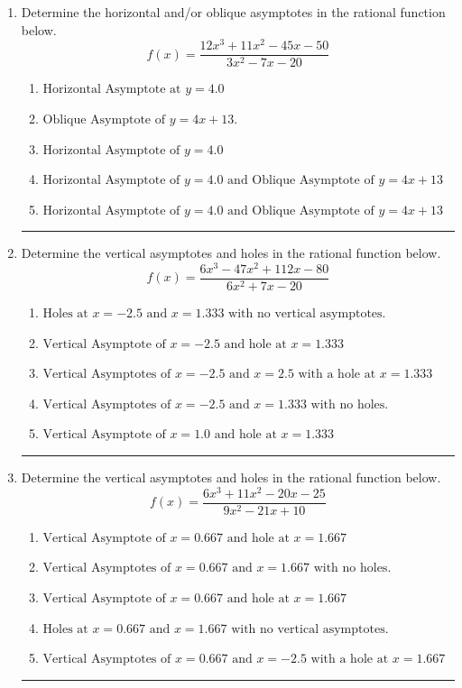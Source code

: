 \documentclass[14pt]{extbook}
\newcommand{\litem}[1]{\item#1\hspace*{-1cm}\rule{\textwidth}{0.4pt}}
\begin{document}
\begin{enumerate}
{\begin{enumerate}[label=\Alph*.]
\end{enumerate} }
\litem{
Determine the horizontal and/or oblique asymptotes in the rational function below.\[ f(x) = \frac{12x^{3} +11 x^{2} -45 x -50}{3x^{2} -7 x -20} \]\begin{enumerate}[label=\Alph*.]
\item \( \text{Horizontal Asymptote at } y = 4.0 \)
\item \( \text{Oblique Asymptote of } y = 4x + 13. \)
\item \( \text{Horizontal Asymptote of } y = 4.0  \)
\item \( \text{Horizontal Asymptote of } y = 4.0 \text{ and Oblique Asymptote of } y = 4x + 13 \)
\item \( \text{Horizontal Asymptote of } y = 4.0 \text{ and Oblique Asymptote of } y = 4x + 13 \)

\end{enumerate} }
\litem{
Determine the vertical asymptotes and holes in the rational function below.\[ f(x) = \frac{6x^{3} -47 x^{2} +112 x -80}{6x^{2} +7 x -20} \]\begin{enumerate}[label=\Alph*.]
\item \( \text{Holes at } x = -2.5 \text{ and } x = 1.333 \text{ with no vertical asymptotes.} \)
\item \( \text{Vertical Asymptote of } x = -2.5 \text{ and hole at } x = 1.333 \)
\item \( \text{Vertical Asymptotes of } x = -2.5 \text{ and } x = 2.5 \text{ with a hole at } x = 1.333 \)
\item \( \text{Vertical Asymptotes of } x = -2.5 \text{ and } x = 1.333 \text{ with no holes.} \)
\item \( \text{Vertical Asymptote of } x = 1.0 \text{ and hole at } x = 1.333 \)

\end{enumerate} }
\litem{
Determine the vertical asymptotes and holes in the rational function below.\[ f(x) = \frac{6x^{3} +11 x^{2} -20 x -25}{9x^{2} -21 x + 10} \]\begin{enumerate}[label=\Alph*.]
\item \( \text{Vertical Asymptote of } x = 0.667 \text{ and hole at } x = 1.667 \)
\item \( \text{Vertical Asymptotes of } x = 0.667 \text{ and } x = 1.667 \text{ with no holes.} \)
\item \( \text{Vertical Asymptote of } x = 0.667 \text{ and hole at } x = 1.667 \)
\item \( \text{Holes at } x = 0.667 \text{ and } x = 1.667 \text{ with no vertical asymptotes.} \)
\item \( \text{Vertical Asymptotes of } x = 0.667 \text{ and } x = -2.5 \text{ with a hole at } x = 1.667 \)


\end{enumerate}}
\end{enumerate}
\end{document}
